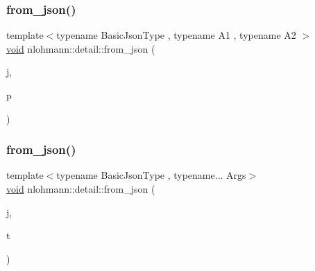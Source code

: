\mbox{\label{namespacenlohmann_1_1detail_aae9f9c2601074e323d49428132cc293d}} 
\subsubsection{\texorpdfstring{from\+\_\+json()}{from\_json()}\hspace{0.1cm}{\footnotesize\ttfamily [15/18]}}
{\footnotesize\ttfamily template$<$typename Basic\+Json\+Type , typename A1 , typename A2 $>$ \\
\hyperlink{namespacenlohmann_1_1detail_a59fca69799f6b9e366710cb9043aa77d}{void} nlohmann\+::detail\+::from\+\_\+json (\begin{DoxyParamCaption}\item[{const Basic\+Json\+Type \&}]{j,  }\item[{std\+::pair$<$ A1, A2 $>$ \&}]{p }\end{DoxyParamCaption})}

\mbox{\label{namespacenlohmann_1_1detail_a8b99ec9b29f3f20a18fc4281fb784e49}} 
\subsubsection{\texorpdfstring{from\+\_\+json()}{from\_json()}\hspace{0.1cm}{\footnotesize\ttfamily [16/18]}}
{\footnotesize\ttfamily template$<$typename Basic\+Json\+Type , typename... Args$>$ \\
\hyperlink{namespacenlohmann_1_1detail_a59fca69799f6b9e366710cb9043aa77d}{void} nlohmann\+::detail\+::from\+\_\+json (\begin{DoxyParamCaption}\item[{const Basic\+Json\+Type \&}]{j,  }\item[{std\+::tuple$<$ Args... $>$ \&}]{t }\end{DoxyParamCaption})}

\mbox{\label{namespacenlohmann_1_1detail_ae93147a54d2740228ef16a5e6210ca3e}} 
